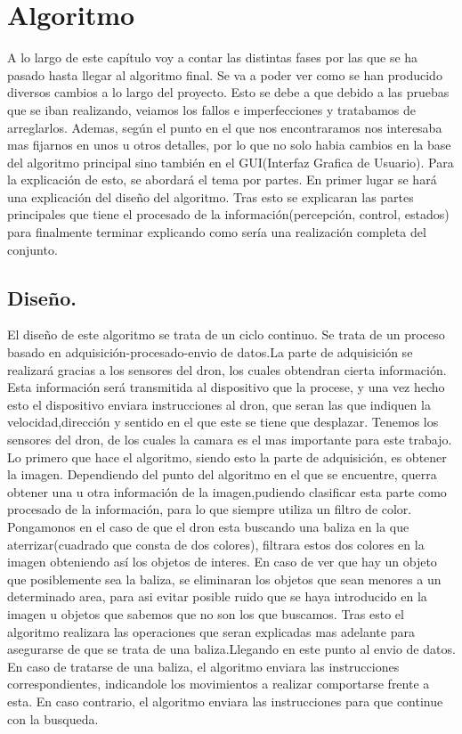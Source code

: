 \chapter{Algoritmo}\label{cap.algoritmo}%

\hspace{1cm} A lo largo de este cap\'itulo voy a contar las distintas fases por las que se ha pasado hasta llegar al algoritmo final. Se va a poder ver como se han producido diversos cambios a lo largo del proyecto. Esto se debe a que debido a las pruebas que se iban realizando, veiamos los fallos e imperfecciones y tratabamos de arreglarlos. Ademas, seg\'un el punto en el que nos encontraramos nos interesaba mas fijarnos en unos u otros detalles, por lo que no solo habia cambios en la base del algoritmo principal sino tambi\'en en el GUI(Interfaz Grafica de Usuario). Para la explicaci\'on de esto, se abordar\'a el tema por partes. En primer lugar se har\'a una explicaci\'on del diseño del algoritmo. Tras esto se explicaran las partes principales que tiene el procesado de la informaci\'on(percepci\'on, control, estados) para finalmente terminar explicando como ser\'ia una realizaci\'on completa del conjunto.



\section{Diseño.}
\hspace{1cm} El diseño de este algoritmo se trata de un ciclo continuo. Se trata de un proceso basado en adquisici\'on-procesado-envio de datos.La parte de adquisici\'on se realizar\'a gracias a los sensores del dron, los cuales obtendran cierta informaci\'on. Esta informaci\'on ser\'a transmitida al dispositivo que la procese, y una vez hecho esto el dispositivo enviara instrucciones al dron, que seran las que indiquen la velocidad,direcci\'on y sentido en el que este se tiene que desplazar.  Tenemos los sensores del dron, de los cuales la camara es el mas importante para este trabajo. Lo primero que hace el algoritmo, siendo esto la parte de adquisici\'on, es obtener la imagen. Dependiendo del punto del algoritmo en el que se encuentre, querra obtener una u otra informaci\'on de la imagen,pudiendo clasificar esta parte como procesado de la informaci\'on, para lo que siempre utiliza un filtro de color. Pongamonos en el caso de que el dron esta buscando una baliza en la que aterrizar(cuadrado que consta de dos colores), filtrara estos dos colores en la imagen obteniendo as\'i los objetos de interes. En caso de ver que hay un objeto que posiblemente sea la baliza, se eliminaran los objetos que sean menores a un determinado area, para asi evitar posible ruido que se haya introducido en la imagen u objetos que sabemos que no son los que buscamos. Tras esto el algoritmo realizara las operaciones que seran explicadas mas adelante para asegurarse de que se trata de una baliza.Llegando en este punto al envio de datos. En caso de tratarse de una baliza, el algoritmo enviara las instrucciones correspondientes, indicandole los movimientos a realizar comportarse frente a esta. En caso contrario, el algoritmo enviara las instrucciones para que continue con la busqueda. 


